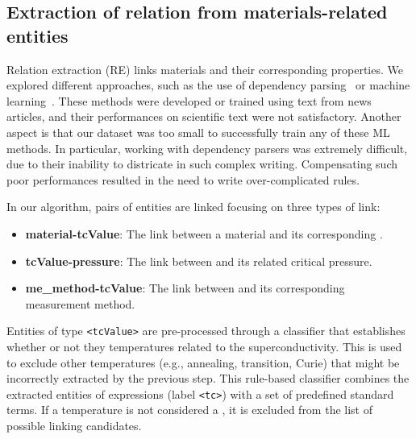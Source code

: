 \subsection{Extraction of relation from materials-related entities}
\label{subsec:re-solution}
\label{subsubsec:linking}

Relation extraction (RE) links materials and their corresponding properties. 
We explored different approaches, such as the use of dependency parsing~\cite{yoshikawa:2017acl, Tiktinsky2020pyBARTES, swayamdipta:17, zhou-zhao-2019-head} or machine learning~\cite{lin2016neural,hariharan2019relation}. 
These methods were developed or trained using text from news articles, and their performances on scientific text were not satisfactory. 
Another aspect is that our dataset was too small to successfully train any of these ML methods. 
In particular, working with dependency parsers was extremely difficult, due to their inability to districate in such complex writing. 
Compensating such poor performances resulted in the need to write over-complicated rules. 


In our algorithm, pairs of entities are linked focusing on three types of link:
\begin{itemize}
    \item \textbf{material-tcValue}: The link between a material and its corresponding \tc.
    \item \textbf{tcValue-pressure}: The link between \tc and its related critical pressure.
    \item \textbf{me\_method-tcValue}: The link between \tc and its corresponding measurement method.
\end{itemize}

Entities of type \texttt{<tcValue>} are pre-processed through a classifier that establishes whether or not they temperatures related to the superconductivity. This is used to exclude other temperatures (e.g., annealing, transition, Curie) that might be incorrectly extracted by the previous step.
This rule-based classifier combines the extracted entities of \tc expressions (label \texttt{<tc>}) with a set of predefined standard terms.
If a temperature is not considered a \tc, it is excluded from the list of possible linking candidates.

